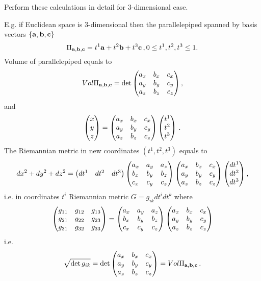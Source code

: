 \documentclass[12pt]{article}
\theoremstyle{theorem}
\numberwithin{equation}{section}
\begin{document}
Perform these calculations in detail for $3$-dimensional case.




E.g. if Euclidean space is $3$-dimensional then the parallelepiped spanned by basis vectors
$\{{\bf a},{\bf b},{\bf c}\}$
                 $$
                 \Pi_{{\bf a},{\bf b},{\bf c}}=t^1{\bf a}+t^2{\bf b}+t^3{\bf c}\,,
                     0\leq t^1,t^2,t^3\leq 1.
                 $$
Volume of parallelepiped equals to
\begin{equation}\label{volparallelepindim3}
Vol \Pi_{{\bf a},{\bf b},{\bf c}}=\det
\begin{pmatrix}
a_x&b_x&c_x\cr
a_y&b_y&c_y\cr
a_z&b_z&c_z\cr
\end{pmatrix},
\end{equation}
and
          $$
\begin{pmatrix}
x\cr
y\cr
z\cr
\end{pmatrix}=
\begin{pmatrix}
a_x&b_x&c_x\cr
a_y&b_y&c_y\cr
a_z&b_z&c_z\cr
\end{pmatrix}
\begin{pmatrix}
t^1\cr
t^2\cr
t^3\cr
\end{pmatrix}\,.
          $$
 The Riemannian metric in new coordinates $(t^1,t^2,t^3)$ equals to
               $$
    dx^2+dy^2+dz^2=\begin{pmatrix}dt^1&dt^2&dt^3\end{pmatrix}
    \begin{pmatrix}
a_x&a_y&a_z\cr
b_x&b_y&b_z\cr
c_x&c_y&c_z\cr
\end{pmatrix}
\begin{pmatrix}
a_x&b_x&c_x\cr
a_y&b_y&c_y\cr
a_z&b_z&c_z\cr
\end{pmatrix}
\begin{pmatrix}
dt^1\cr
dt^2\cr
dt^3\cr
\end{pmatrix},
    $$
i.e. in coordinates $t^i$ Riemannian metric $G=g_{ik}dt^idt^k$ where
           $$
\begin{pmatrix}
g_{11}&g_{12}&g_{13}\cr
g_{21}&g_{22}&g_{23}\cr
g_{31}&g_{32}&g_{33}\cr
\end{pmatrix}=
           \begin{pmatrix}
a_x&a_y&a_z\cr
b_x&b_y&b_z\cr
c_x&c_y&c_z\cr
\end{pmatrix}
\begin{pmatrix}
a_x&b_x&c_x\cr
a_y&b_y&c_y\cr
a_z&b_z&c_z\cr
\end{pmatrix}
           $$
i.e.
              \begin{equation}\label{volparapll3-2}
\sqrt {\det g_{ik}}=\det \begin{pmatrix}
a_x&b_x&c_x\cr
a_y&b_y&c_y\cr
a_z&b_z&c_z\cr
\end{pmatrix}=Vol \Pi_{{\bf a},{\bf b},{\bf c}}\,.
              \end{equation}
\end{document}
